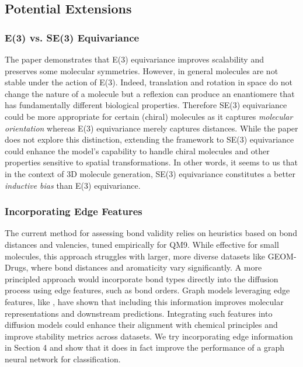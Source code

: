 \documentclass[sigconf]{acmart}
\begin{document}
\subsection{Potential Extensions}
\subsubsection{E(3) vs. SE(3) Equivariance}
The paper demonstrates that E(3) equivariance improves scalability and preserves some molecular symmetries. However, in general molecules are not stable under the action of E(3). Indeed, translation and rotation in space do not change the nature of a molecule but a reflexion can produce an enantiomere that has fundamentally different biological properties. Therefore SE(3) equivariance could be more appropriate for certain (chiral) molecules as it captures \textit{molecular orientation} whereas E(3) equivariance merely captures distances. While the paper does not explore this distinction, extending the framework to SE(3) equivariance could enhance the model’s capability to handle chiral molecules and other properties sensitive to spatial transformations. In other words, it seems to us that in the context of 3D molecule generation, SE(3) equivariance constitutes a better \textit{inductive bias} than E(3) equivariance.

\subsubsection{Incorporating Edge Features}
The current method for assessing bond validity relies on heuristics based on bond distances and valencies, tuned empirically for QM9. While effective for small molecules, this approach struggles with larger, more diverse datasets like GEOM-Drugs, where bond distances and aromaticity vary significantly. A more principled approach would incorporate bond types directly into the diffusion process using edge features, such as bond orders. Graph models leveraging edge features, like \cite{gilmer2017neuralmessagepassingquantum}, have shown that including this information improves molecular representations and downstream predictions. Integrating such features into diffusion models could enhance their alignment with chemical principles and improve stability metrics across datasets. We try incorporating edge information in Section 4 and show that it does in fact improve the performance of a graph neural network for classification.
\end{document}

